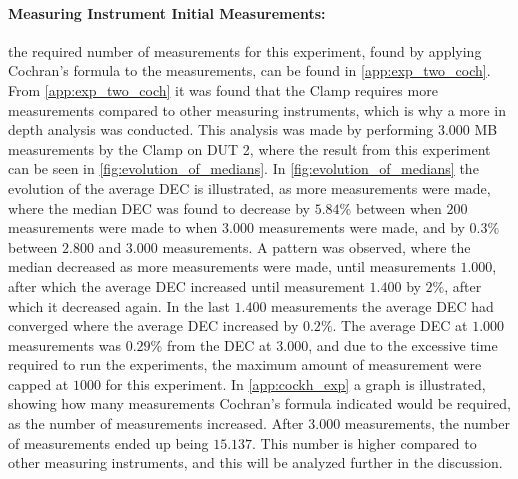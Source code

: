 \paragraph{Measuring Instrument Initial Measurements:} the required number of measurements for this experiment, found by applying Cochran's formula to the measurements, can be found in \cref{app:exp_two_coch}. %
From \cref{app:exp_two_coch} it was found that the Clamp requires more measurements compared to other measuring instruments, which is why a more in depth analysis was conducted. This analysis was made by performing $3.000$ MB measurements by the Clamp on DUT 2, where the result from this experiment can be seen in \cref{fig:evolution_of_medians}. In \cref{fig:evolution_of_medians} the evolution of the average DEC is illustrated, as more measurements were made, where the median DEC was found to decrease by $5.84\%$ between when $200$ measurements were made to when $3.000$ measurements were made, and by $0.3\%$ between $2.800$ and $3.000$ measurements. A pattern was observed, where the median decreased as more measurements were made, until measurements $1.000$, after which the average DEC increased until measurement $1.400$ by $2\%$, after which it decreased again. In the last $1.400$ measurements the average DEC had converged where the average DEC increased by $0.2\%$. The average DEC at $1.000$ measurements was $0.29\%$ from the DEC at $3.000$, and due to the excessive time required to run the experiments, the maximum amount of measurement were capped at $1000$ for this experiment. In \cref{app:cockh_exp} a graph is illustrated, showing how many measurements Cochran's formula indicated would be required, as the number of measurements increased. After $3.000$ measurements, the number of measurements ended up being $15.137$. This number is higher compared to other measuring instruments, and this will be analyzed further in the discussion.


